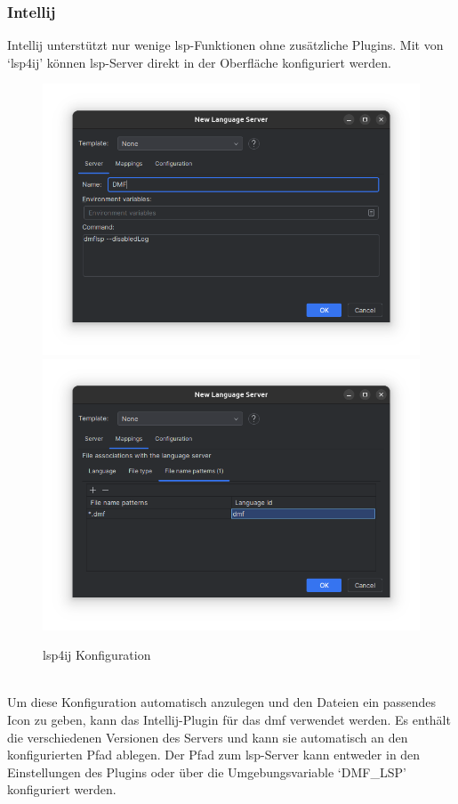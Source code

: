 \documentclass[./einleitung.tex]{subfiles}
\begin{document}
    \subsubsection{Intellij}
    Intellij unterstützt nur wenige \acrshort{lsp}-Funktionen ohne zusätzliche Plugins.
    Mit von `lsp4ij' können \acrshort{lsp}-Server direkt in der Oberfläche konfiguriert werden.\\
    \begin{figure}[h]
        \includegraphics[width=\linewidth / 2]{bilder/screenshot-add-lsp-lsp4ij}
        \includegraphics[width=\linewidth / 2]{bilder/screenshot-file-mapping}
        \caption{lsp4ij Konfiguration}
        \label{fig:screenshot-add-lsp-lsp4ij}
    \end{figure}\\
    Um diese Konfiguration automatisch anzulegen und den Dateien ein passendes Icon zu geben, kann das Intellij-Plugin für das \acrshort{dmf} verwendet werden.
    Es enthält die verschiedenen Versionen des Servers und kann sie automatisch an den konfigurierten Pfad ablegen.
    Der Pfad zum \acrshort{lsp}-Server kann entweder in den Einstellungen des Plugins oder über die Umgebungsvariable `DMF\_LSP' konfiguriert werden.
\end{document}
